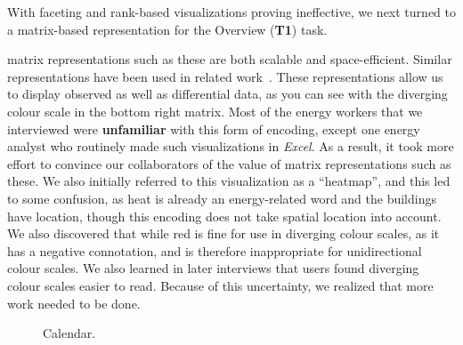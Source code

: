 \documentclass[journal]{vgtc}                %
\newcommand{\bstart}[1]{\vspace{1mm} \noindent{\textbf{#1:}}}
\begin{document}


With faceting and rank-based visualizations proving ineffective, we next turned to a matrix-based representation for the Overview ({\bf T1}) task.

\bstart{Time-series matrix} matrix representations such as these are both scalable and space-efficient.
Similar representations have been used in related work~\cite{Goodwin2013}.
These representations allow us to display observed as well as differential data, as you can see with the diverging colour scale in the bottom right matrix.
Most of the energy workers that we interviewed were {\bf unfamiliar} with this form of encoding, except one energy analyst who routinely made such visualizations in {\it Excel}. 
As a result, it took more effort to convince our collaborators of the value of matrix representations such as these.
We also initially referred to this visualization as a ``heatmap'', and this led to some confusion, as heat is already an energy-related word and the buildings have location, though this encoding does not take spatial location into account.
We also discovered that while red is fine for use in diverging colour scales, as it has a negative connotation, and is therefore inappropriate for unidirectional colour scales. 
We also learned in later interviews that users found diverging colour scales easier to read.
Because of this uncertainty, we realized that more work needed to be done.

\begin{figure}[ht]
    \vspace{-0.3cm}
	\centering
	\vspace{-0.3cm}
	\caption{Calendar.}
	\label{fig:sandbox-calendar}
	\vspace{-0.3cm}
\end{figure}
\end{document}
